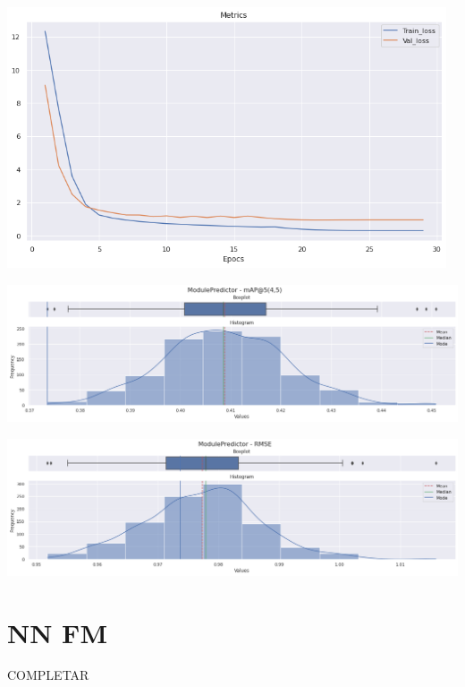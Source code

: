 \documentclass[11pt,a4paper,twoside]{thesis}
\begin{document}
\begin{center}
	\includegraphics[width=13cm]{./images/metrics-BGFM-train-val-loss.png}
\end{center}

\begin{center}
\includegraphics[width=15cm]{./images/metrics-BGFM-mapk.png}
\end{center}

\begin{center}
\includegraphics[width=15cm]{./images/metrics-BGFM-RMSE.png}
\end{center}


\section{NN FM}

COMPLETAR
\end{document}

